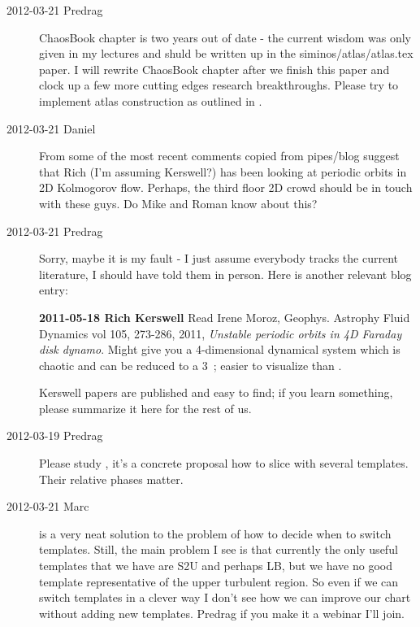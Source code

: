\begin{description}
\item[2012-03-21 Predrag]
ChaosBook chapter is two years out of date - the current wisdom was only
given in my lectures and shuld be written up in the
siminos/atlas/atlas.tex paper. I will rewrite ChaosBook chapter after we
finish this paper and clock up a few more cutting edges research
breakthroughs. Please try to implement atlas construction as outlined in
.

\item[2012-03-21 Daniel]
From some of the most recent comments copied from pipes/blog suggest that
Rich (I'm assuming Kerswell?) has been looking at periodic orbits in 2D
Kolmogorov flow. Perhaps, the third floor 2D crowd should be in touch
with these guys. Do Mike and Roman know about this?

\item[2012-03-21 Predrag]
Sorry, maybe it is my fault - I just assume everybody tracks the current
literature, I should have told them in person. Here is another relevant
blog entry:

{\bf 2011-05-18  Rich Kerswell} Read Irene Moroz, Geophys. Astrophy Fluid
Dynamics vol 105, 273-286, 2011, \emph{Unstable periodic orbits in 4D
Faraday disk dynamo}. Might give you a 4-dimensional dynamical system
which is chaotic and can be reduced to a 3\dmn\ \statesp; easier to
visualize than {\cLf}.

Kerswell papers are published and easy to find; if you learn something,
please summarize it here for the rest of us.

\item[2012-03-19 Predrag~~] Please study , it's a
concrete proposal how to slice with several templates. Their relative
phases matter.

\item[2012-03-21 Marc~~]  is a very neat solution
to the problem of how to decide when to switch templates. Still, the
main problem I see is that currently the only useful templates that we
have are S2U and perhaps LB, but we have no good template
representative of the upper turbulent region. So even if we can switch
templates in a clever way I don't see how we can improve our chart without
adding new templates. Predrag if you make it a webinar I'll join.


\end{description}
